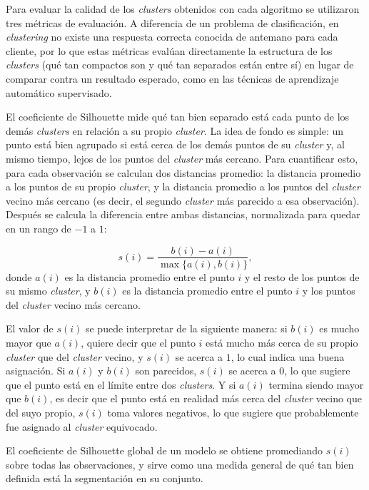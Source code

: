 \documentclass[a4paper,10pts,openany]{book}
\begin{document}
	Para evaluar la calidad de los \emph{clusters} obtenidos con cada algoritmo se utilizaron tres métricas de evaluación. A diferencia de un problema de clasificación, en \emph{clustering} no existe una respuesta correcta conocida de antemano para cada cliente, por lo que estas métricas evalúan directamente la estructura de los \emph{clusters} (qué tan compactos son y qué tan separados están entre sí) en lugar de comparar contra un resultado esperado, como en las técnicas de aprendizaje automático supervisado.
	
	El coeficiente de Silhouette mide qué tan bien separado está cada punto de los demás \emph{clusters} en relación a su propio \emph{cluster}. La idea de fondo es simple: un punto está bien agrupado si está cerca de los demás puntos de su \emph{cluster} y, al mismo tiempo, lejos de los puntos del \emph{cluster} más cercano. Para cuantificar esto, para cada observación se calculan dos distancias promedio: la distancia promedio a los puntos de su propio \emph{cluster}, y la distancia promedio a los puntos del \emph{cluster} vecino más cercano (es decir, el segundo \emph{cluster} más parecido a esa observación). Después se calcula la diferencia entre ambas distancias, normalizada para quedar en un rango de $-1$ a $1$:
	
	\begin{equation}
		s(i) = \frac{b(i) - a(i)}{\max\{a(i), b(i)\}},
	\end{equation}
	donde $a(i)$ es la distancia promedio entre el punto $i$ y el resto de los puntos de su mismo \emph{cluster}, y $b(i)$ es la distancia promedio entre el punto $i$ y los puntos del \emph{cluster} vecino más cercano.
	
	El valor de $s(i)$ se puede interpretar de la siguiente manera: si $b(i)$ es mucho mayor que $a(i)$, quiere decir que el punto $i$ está mucho más cerca de su propio \emph{cluster} que del \emph{cluster} vecino, y $s(i)$ se acerca a $1$, lo cual indica una buena asignación. Si $a(i)$ y $b(i)$ son parecidos, $s(i)$ se acerca a $0$, lo que sugiere que el punto está en el límite entre dos \emph{clusters}. Y si $a(i)$ termina siendo mayor que $b(i)$, es decir que el punto está en realidad más cerca del \emph{cluster} vecino que del suyo propio, $s(i)$ toma valores negativos, lo que sugiere que probablemente fue asignado al \emph{cluster} equivocado.
	
	El coeficiente de Silhouette global de un modelo se obtiene promediando $s(i)$ sobre todas las observaciones, y sirve como una medida general de qué tan bien definida está la segmentación en su conjunto.
	
\end{document}
